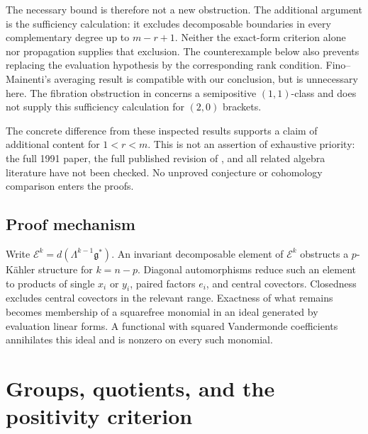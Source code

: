 \documentclass[12pt]{amsart}
\theoremstyle{definition}
\theoremstyle{remark}
\numberwithin{equation}{section}
\newcommand{\gfr}{\mathfrak g}
\newcommand{\Eex}{\mathcal E}
\begin{document}
The necessary bound is therefore not a new obstruction. The additional
argument is the sufficiency calculation: it excludes decomposable
boundaries in every complementary degree up to $m-r+1$. Neither the
exact-form criterion alone nor propagation supplies that exclusion.
The counterexample below also prevents replacing the evaluation
hypothesis by the corresponding rank condition. Fino--Mainenti's
averaging result \cite[Lemma 2.4]{en:FM} is compatible with our conclusion,
but is unnecessary here. The fibration obstruction in
\cite[Theorem 3.1]{en:FGM} concerns a semipositive $(1,1)$-class and does
not supply this sufficiency calculation for $(2,0)$ brackets.

The concrete difference from these inspected results supports a claim
of additional content for $1<r<m$. This is not an assertion of exhaustive
priority: the full 1991 paper, the full published revision of
\cite{en:LG}, and all related algebra literature have not been checked.
No unproved conjecture or cohomology comparison enters the proofs.

\subsection{Proof mechanism}
Write $\Eex^k=d(\Lambda^{k-1}\gfr^*)$. An invariant decomposable element of
$\Eex^k$ obstructs a $p$-K\"ahler structure for $k=n-p$. Diagonal
automorphisms reduce such an element to products of single $x_i$ or $y_i$,
paired factors $e_i$, and central covectors. Closedness excludes central
covectors in the relevant range. Exactness of what remains becomes
membership of a squarefree monomial in an ideal generated by evaluation
linear forms. A functional with squared Vandermonde coefficients
annihilates this ideal and is nonzero on every such monomial.

\section{Groups, quotients, and the positivity criterion}
\end{document}
